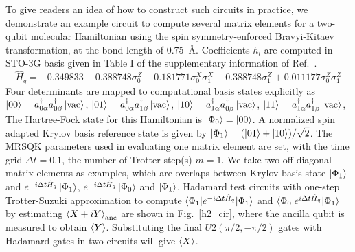 \documentclass[journal=jctcce,manuscript=article]{achemso}
\newcommand{\methodabbr}[0]{MRSQK\xspace}
\begin{document}
To give readers an idea of how to construct such circuits in practice, we demonstrate an example circuit to compute several matrix elements for a two-qubit molecular  Hamiltonian\cite{OMalley:2016dc} using the spin symmetry-enforced Bravyi-Kitaev transformation,\cite{Moll_2016, Bravyi:2017wb} at the bond length of 0.75~\AA{}. Coefficients $h_l$ are computed in STO-3G basis given in Table I of the supplementary information of Ref.~. 
\begin{equation}
\hat{H}_q = -0.349833 - 0.388748\sigma_0^Z  + 0.181771\sigma_0^X \sigma_1^X - 0.388748 \sigma_1^Z + 0.011177\sigma_0^Z \sigma_1^Z
\end{equation}
Four determinants are mapped to computational basis states explicitly as 
$\left\vert{00}\right\rangle = a_{0 \alpha}^{\dagger} a_{0 \beta}^{\dagger}  \left\vert{\mathrm{vac}}\right\rangle$, 
$\left\vert{01}\right\rangle = a_{0 \alpha}^{\dagger} a_{1 \beta}^{\dagger}  \left\vert{\mathrm{vac}}\right\rangle$, 
$\left\vert{10}\right\rangle = a_{1 \alpha}^{\dagger} a_{0 \beta}^{\dagger}  \left\vert{\mathrm{vac}}\right\rangle$, 
$\left\vert{11}\right\rangle = a_{1 \alpha}^{\dagger} a_{1 \beta}^{\dagger}  \left\vert{\mathrm{vac}}\right\rangle$, 
The Hartree-Fock state for this Hamiltonian is $\left\vert{\Phi_0}\right\rangle = \left\vert{00}\right\rangle$.
A normalized spin adapted Krylov basis reference state is given by $\left\vert{\Phi_1}\right\rangle= (\left\vert{01}\right\rangle + \left\vert{10}\right\rangle ) / \sqrt{2}$.
The \methodabbr parameters used in evaluating one matrix element are set, with the time grid $\Delta t = 0.1$, the number of Trotter step(s) $m=1$.  
We take two off-diagonal matrix elements as examples, which are overlaps between Krylov basis state $\left\vert{\Phi_1}\right\rangle$ and $e^{-i \Delta t \hat{H}_q }  \left\vert{\Phi_1}\right\rangle$, $e^{-i \Delta t \hat{H}_q }  \left\vert{\Phi_0}\right\rangle$ and $\left\vert{\Phi_1}\right\rangle$.
Hadamard test circuits with one-step Trotter-Suzuki approximation to compute $\braket{\Phi_1  | e^{-i \Delta t \hat{H}_q}  |  \Phi_1}$ and $\braket{\Phi_0  | e^{i \Delta t \hat{H}_q}  |  \Phi_1}$
by estimating $\braket{X+iY}_\mathrm{anc}$ are shown in Fig.~\ref{h2_cir}, where the ancilla qubit is measured to obtain $\braket{Y}$.
Substituting the final $U2(\pi/2, -\pi/2)$ gates with Hadamard gates in two circuits will give $\braket{X}$. 
\end{document}
